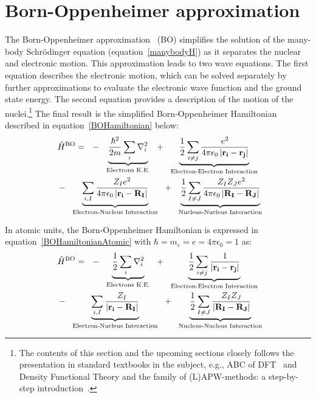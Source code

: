 \section{Born-Oppenheimer approximation}
\label{BO}
The Born-Oppenheimer approximation~\cite{Born1998} (BO) simplifies the solution of the many-body Schr\"{o}dinger equation (equation~\ref{manybodyH}) as it separates the nuclear and electronic motion. This approximation leads to two wave equations. The first equation describes the electronic motion, which can be solved separately by further approximations to evaluate the electronic wave function and the ground state energy. The second equation provides a description of the motion of the nuclei.\footnote{The contents of this section and the upcoming sections closely follows the presentation in standard textbooks in the subject, e.g., ABC of DFT~\cite{ABCofDFT} and Density Functional Theory and the family of (L)APW-methods: a step-by-step introduction~\cite{planewaveBook}.} The final result is the simplified Born-Oppenheimer Hamiltonian described in equation~\ref{BOHamiltonian} below:
\begin{multline}
\hat{H}^{\text{BO}}=\,\,\,\,-\,\,\,\,\underbrace{\frac{\hbar^2}{2m}\sum_{i}{\nabla_i^2}}_\textrm{Electrons K.E.}\,\,\,\,+\,\,\,\,\underbrace{{1 \over 2} \sum_{i \neq j}{\frac{e^2}{4\pi\epsilon_0\left| \mathbf{r_i}-\mathbf{r_j} \right|}}}_\textrm{Electron-Electron Interaction}\\
\,\,\,\,-\,\,\,\,\underbrace{\sum_{i,I}{\frac{Z_Ie^2}{4\pi\epsilon_0\left| \mathbf{r_i}-\mathbf{R_I} \right|}}}_\textrm{Electron-Nucleus Interaction}\,\,\,\,+\,\,\,\,\underbrace{{1 \over 2} \sum_{I \neq J}{\frac{Z_I Z_Je^2}{4\pi\epsilon_0\left| \mathbf{R_I}-\mathbf{R_J} \right|}}}_\textrm{Nucleus-Nucleus Interaction}
\label{BOHamiltonian}
\end{multline}

In atomic units, the Born-Oppenheimer Hamiltonian is expressed in equation~\ref{BOHamiltonianAtomic} with $\hbar=m_e=e=4\pi\epsilon_0=1$ as: 
\begin{multline}
\hat{H}^{\text{BO}}=\,\,\,\,-\,\,\,\,\underbrace{\frac{1}{2}\sum_{i}{\nabla_i^2}}_\textrm{Electrons K.E.}\,\,\,\,+\,\,\,\,\underbrace{{1 \over 2} \sum_{i \neq j}{\frac{1}{\left| \mathbf{r_i}-\mathbf{r_j} \right|}}}_\textrm{Electron-Electron Interaction}\\
\,\,\,\,-\,\,\,\,\underbrace{\sum_{i,I}{\frac{Z_I}{\left| \mathbf{r_i}-\mathbf{R_I} \right|}}}_\textrm{Electron-Nucleus Interaction}\,\,\,\,+\,\,\,\,\underbrace{{1 \over 2} \sum_{I \neq J}{\frac{Z_I Z_J}{\left| \mathbf{R_I}-\mathbf{R_J} \right|}}}_\textrm{Nucleus-Nucleus Interaction}
\label{BOHamiltonianAtomic}
\end{multline}
